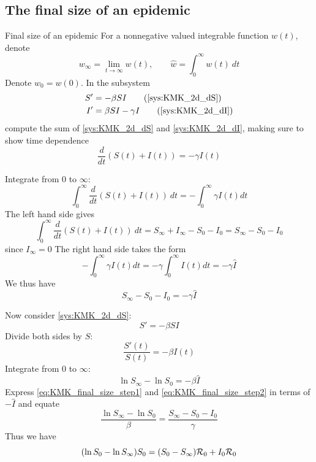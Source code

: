 \documentclass[aspectratio=43]{beamer}
\begin{document}
\subsection{The final size of an epidemic}

\begin{frame}{Final size of an epidemic}
  For a nonnegative valued integrable function $w(t)$, denote
  $$
  w_\infty = \lim_{t\to\infty}w(t),\qquad\hat w = \int_0^\infty w(t)\ dt
  $$
  Denote $w_0=w(0)$. In the subsystem
  \begin{align}
  S' &= -\beta SI \tag{\ref{sys:KMK_2d_dS}} \\
  I' &= \beta SI-\gamma I \tag{\ref{sys:KMK_2d_dI}} 
  \end{align}
  compute the sum of \eqref{sys:KMK_2d_dS} and \eqref{sys:KMK_2d_dI}, making sure to show time dependence $$
  \frac{d}{dt}(S(t)+I(t))=-\gamma I(t)
  $$
\end{frame}


\begin{frame}{}
  Integrate from 0 to $\infty$:
  $$
  \int_0^\infty\frac{d}{dt}(S(t)+I(t))\ dt=-\int_0^\infty\gamma I(t)dt 
  $$
  The left hand side gives
  $$
  \int_0^\infty\frac{d}{dt}(S(t)+I(t))\ dt
  = S_\infty+I_\infty-S_0-I_0 = S_\infty-S_0-I_0
  $$
  since $I_\infty=0$
  \vfill
  The right hand side takes the form
  $$
  -\int_0^\infty\gamma I(t)dt = -\gamma\int_0^\infty I(t)dt = -\gamma \hat I
  $$
  We thus have
  \begin{equation}
  \label{eq:KMK_final_size_step1}
  S_\infty-S_0-I_0 = -\gamma\hat I
  \end{equation}
\end{frame}



\begin{frame}{}
  Now consider \eqref{sys:KMK_2d_dS}:
  $$
  S' = -\beta SI
  $$
  Divide both sides by $S$:
  $$
  \frac{S'(t)}{S(t)} = -\beta I(t)
  $$
  Integrate from 0 to $\infty$:
  \begin{equation}
  \label{eq:KMK_final_size_step2}
  \ln S_\infty-\ln S_0 = -\beta \hat I
  \end{equation}
  Express \eqref{eq:KMK_final_size_step1} and \eqref{eq:KMK_final_size_step2} in terms of $-\hat I$ and equate
  $$
  \frac{\ln S_\infty-\ln S_0}{\beta}
  =
  \frac{S_\infty-S_0-I_0}{\gamma}
  $$
  Thus we have
  \begin{equation}
  \label{eq:final_size}
  (\ln S_0-\ln S_\infty)S_0 = (S_0-S_\infty)\mathcal{R}_0+I_0\mathcal{R}_0
  \end{equation}
\end{frame}
\end{document}
